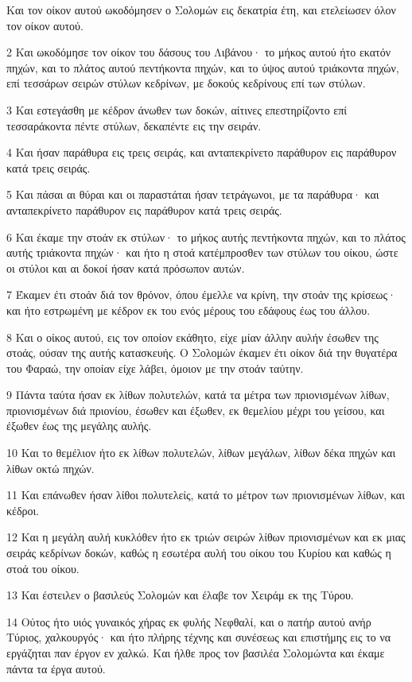 \par Και τον οίκον αυτού ωκοδόμησεν ο Σολομών εις δεκατρία έτη, και ετελείωσεν όλον τον οίκον αυτού.
\par 2 Και ωκοδόμησε τον οίκον του δάσους του Λιβάνου· το μήκος αυτού ήτο εκατόν πηχών, και το πλάτος αυτού πεντήκοντα πηχών, και το ύψος αυτού τριάκοντα πηχών, επί τεσσάρων σειρών στύλων κεδρίνων, με δοκούς κεδρίνους επί των στύλων.
\par 3 Και εστεγάσθη με κέδρον άνωθεν των δοκών, αίτινες επεστηρίζοντο επί τεσσαράκοντα πέντε στύλων, δεκαπέντε εις την σειράν.
\par 4 Και ήσαν παράθυρα εις τρεις σειράς, και ανταπεκρίνετο παράθυρον εις παράθυρον κατά τρεις σειράς.
\par 5 Και πάσαι αι θύραι και οι παραστάται ήσαν τετράγωνοι, με τα παράθυρα· και ανταπεκρίνετο παράθυρον εις παράθυρον κατά τρεις σειράς.
\par 6 Και έκαμε την στοάν εκ στύλων· το μήκος αυτής πεντήκοντα πηχών, και το πλάτος αυτής τριάκοντα πηχών· και ήτο η στοά κατέμπροσθεν των στύλων του οίκου, ώστε οι στύλοι και αι δοκοί ήσαν κατά πρόσωπον αυτών.
\par 7 Έκαμεν έτι στοάν διά τον θρόνον, όπου έμελλε να κρίνη, την στοάν της κρίσεως· και ήτο εστρωμένη με κέδρον εκ του ενός μέρους του εδάφους έως του άλλου.
\par 8 Και ο οίκος αυτού, εις τον οποίον εκάθητο, είχε μίαν άλλην αυλήν έσωθεν της στοάς, ούσαν της αυτής κατασκευής. Ο Σολομών έκαμεν έτι οίκον διά την θυγατέρα του Φαραώ, την οποίαν είχε λάβει, όμοιον με την στοάν ταύτην.
\par 9 Πάντα ταύτα ήσαν εκ λίθων πολυτελών, κατά τα μέτρα των πριονισμένων λίθων, πριονισμένων διά πριονίου, έσωθεν και έξωθεν, εκ θεμελίου μέχρι του γείσου, και έξωθεν έως της μεγάλης αυλής.
\par 10 Και το θεμέλιον ήτο εκ λίθων πολυτελών, λίθων μεγάλων, λίθων δέκα πηχών και λίθων οκτώ πηχών.
\par 11 Και επάνωθεν ήσαν λίθοι πολυτελείς, κατά το μέτρον των πριονισμένων λίθων, και κέδροι.
\par 12 Και η μεγάλη αυλή κυκλόθεν ήτο εκ τριών σειρών λίθων πριονισμένων και εκ μιας σειράς κεδρίνων δοκών, καθώς η εσωτέρα αυλή του οίκου του Κυρίου και καθώς η στοά του οίκου.
\par 13 Και έστειλεν ο βασιλεύς Σολομών και έλαβε τον Χειράμ εκ της Τύρου.
\par 14 Ούτος ήτο υιός γυναικός χήρας εκ φυλής Νεφθαλί, και ο πατήρ αυτού ανήρ Τύριος, χαλκουργός· και ήτο πλήρης τέχνης και συνέσεως και επιστήμης εις το να εργάζηται παν έργον εν χαλκώ. Και ήλθε προς τον βασιλέα Σολομώντα και έκαμε πάντα τα έργα αυτού.
